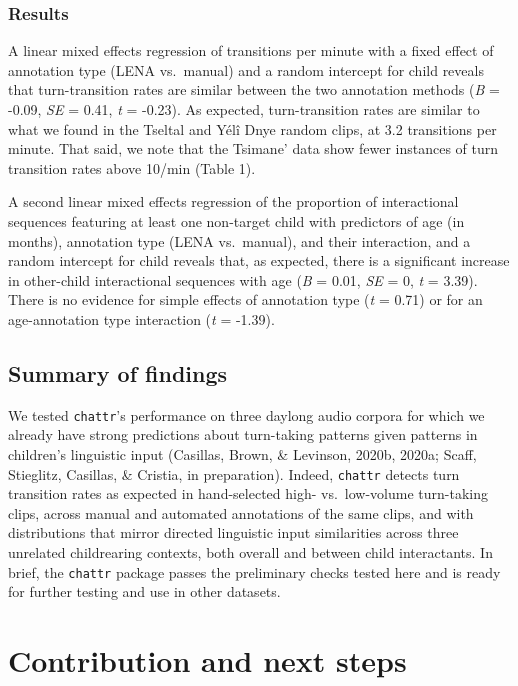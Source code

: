 \documentclass[10pt, letterpaper]{article}
\begin{document}
\hypertarget{results-1}{%
\subsubsection{Results}\label{results-1}}

A linear mixed effects regression of transitions per minute with a fixed
effect of annotation type (LENA vs.~manual) and a random intercept for
child reveals that turn-transition rates are similar between the two
annotation methods (\emph{B} = -0.09, \emph{SE} = 0.41, \emph{t} =
-0.23). As expected, turn-transition rates are similar to what we found
in the Tseltal and Yélî Dnye random clips, at 3.2 transitions per
minute. That said, we note that the Tsimane' data show fewer instances
of turn transition rates above 10/min (Table 1).

A second linear mixed effects regression of the proportion of
interactional sequences featuring at least one non-target child with
predictors of age (in months), annotation type (LENA vs.~manual), and
their interaction, and a random intercept for child reveals that, as
expected, there is a significant increase in other-child interactional
sequences with age (\emph{B} = 0.01, \emph{SE} = 0, \emph{t} = 3.39).
There is no evidence for simple effects of annotation type (\emph{t} =
0.71) or for an age-annotation type interaction (\emph{t} = -1.39).

\hypertarget{summary-of-findings}{%
\subsection{Summary of findings}\label{summary-of-findings}}

We tested \texttt{chattr}'s performance on three daylong audio corpora
for which we already have strong predictions about turn-taking patterns
given patterns in children's linguistic input (Casillas, Brown, \&
Levinson, 2020b, 2020a; Scaff, Stieglitz, Casillas, \& Cristia, in
preparation). Indeed, \texttt{chattr} detects turn transition rates as
expected in hand-selected high- vs.~low-volume turn-taking clips, across
manual and automated annotations of the same clips, and with
distributions that mirror directed linguistic input similarities across
three unrelated childrearing contexts, both overall and between child
interactants. In brief, the \texttt{chattr} package passes the
preliminary checks tested here and is ready for further testing and use
in other datasets.

\hypertarget{contribution-and-next-steps}{%
\section{Contribution and next
steps}\label{contribution-and-next-steps}}
\end{document}
